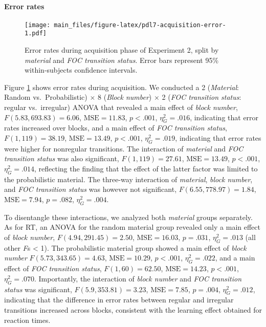 \documentclass[man]{apa6}
\theoremstyle{definition}
\theoremstyle{definition}
\theoremstyle{definition}
\theoremstyle{remark}
\begin{document}
\paragraph{Error rates}\label{error-rates-1}

\begin{figure}[htbp]
\centering
\texttt{[image: main\_files/figure-latex/pdl7-acquisition-error-1.pdf]}
\caption{\label{fig:pdl7-acquisition-error}Error rates during acquisition
phase of Experiment 2, split by \emph{material} and \emph{FOC transition
status}. Error bars represent 95\% within-subjects confidence
intervals.}
\end{figure}

Figure \ref{fig:pdl7-acquisition-error} shows error rates during
acquisition. We conducted a 2 (\emph{Material}: Random
vs.~Probabilistic) \(\times\) 8 (\emph{Block number}) \(\times\) 2
(\emph{FOC transition status}: regular vs.~irregular) ANOVA that
revealed a main effect of \emph{block number},
\(F(5.83, 693.83) = 6.06\), \(\mathrm{MSE} = 11.83\), \(p < .001\),
\(\eta^2_G = .016\), indicating that error rates increased over blocks,
and a main effect of \emph{FOC transition status},
\(F(1, 119) = 38.19\), \(\mathrm{MSE} = 13.49\), \(p < .001\),
\(\eta^2_G = .019\), indicating that error rates were higher for
nonregular transitions. The interaction of \emph{material} and \emph{FOC
transition status} was also significant, \(F(1, 119) = 27.61\),
\(\mathrm{MSE} = 13.49\), \(p < .001\), \(\eta^2_G = .014\), reflecting
the finding that the effect of the latter factor was limited to the
probabilistic material. The three-way interaction of \emph{material},
\emph{block number}, and \emph{FOC transition status} was however not
significant, \(F(6.55, 778.97) = 1.84\), \(\mathrm{MSE} = 7.94\),
\(p = .082\), \(\eta^2_G = .004\).

To disentangle these interactions, we analyzed both \emph{material}
groups separately. As for RT, an ANOVA for the random material group
revealed only a main effect of \emph{block number},
\(F(4.94, 291.45) = 2.50\), \(\mathrm{MSE} = 16.03\), \(p = .031\),
\(\eta^2_G = .013\) (all other \emph{F}s \textless{} 1). The
probabilistic material group showed a main effect of \emph{block number}
\(F(5.73, 343.65) = 4.63\), \(\mathrm{MSE} = 10.29\), \(p < .001\),
\(\eta^2_G = .022\), and a main effect of \emph{FOC transition status},
\(F(1, 60) = 62.50\), \(\mathrm{MSE} = 14.23\), \(p < .001\),
\(\eta^2_G = .070\). Importantly, the interaction of \emph{block number}
and \emph{FOC transition status} was significant,
\(F(5.9, 353.81) = 3.23\), \(\mathrm{MSE} = 7.85\), \(p = .004\),
\(\eta^2_G = .012\), indicating that the difference in error rates
between regular and irregular transitions increased across blocks,
consistent with the learning effect obtained for reaction times.
\end{document}
